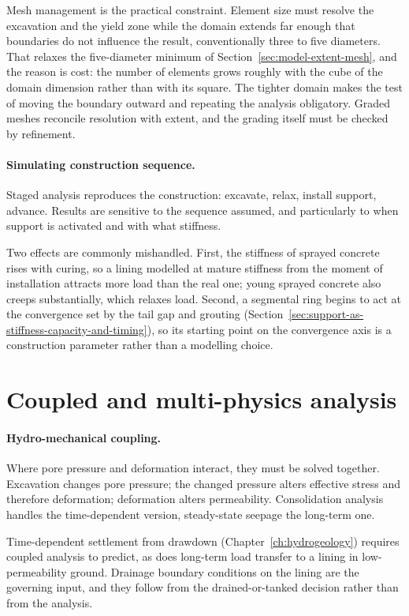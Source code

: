 Mesh management is the practical constraint. Element size must resolve the
excavation and the yield zone while the domain extends far enough that
boundaries do not influence the result, conventionally three to five
diameters. That relaxes the five-diameter minimum of
Section~\ref{sec:model-extent-mesh}, and the reason is cost: the number of
elements grows roughly with the cube of the domain dimension rather than with
its square. The tighter domain makes the test of moving the boundary outward
and repeating the analysis obligatory. Graded meshes reconcile resolution with extent, and the grading
itself must be checked by refinement.

\paragraph{Simulating construction sequence.}
Staged analysis reproduces the construction: excavate, relax, install support,
advance. Results are sensitive to the sequence assumed, and particularly to
when support is activated and with what stiffness.

Two effects are commonly mishandled. First, the stiffness of sprayed concrete rises with curing, so
a lining modelled at mature stiffness from the moment of installation attracts
more load than the real one; young sprayed concrete also creeps substantially, which
relaxes load. Second, a segmental ring begins to act at the convergence set by
the tail gap and grouting
(Section~\ref{sec:support-as-stiffness-capacity-and-timing}), so its starting
point on the convergence axis is a construction parameter rather than a
modelling choice.

\section{Coupled and multi-physics analysis}
\label{sec:coupled-analysis}

\paragraph{Hydro-mechanical coupling.}
Where pore pressure and deformation interact, they must be solved together.
Excavation changes pore pressure; the changed pressure alters effective stress
and therefore deformation; deformation alters permeability. Consolidation
analysis handles the time-dependent version, steady-state seepage the
long-term one.

Time-dependent settlement from drawdown
(Chapter~\ref{ch:hydrogeology}) requires coupled analysis to predict, as does
long-term load transfer to a lining in low-permeability ground. Drainage
boundary conditions on the lining are the governing input, and
they follow from the drained-or-tanked decision rather than from the analysis.


